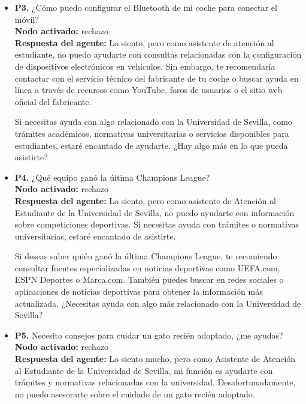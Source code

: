 \documentclass{article}
\begin{document}
\begin{itemize}
      \item \textbf{P3.} ¿Cómo puedo configurar el Bluetooth de mi coche para conectar el móvil? \\
            \textbf{Nodo activado:} rechazo \\
            \textbf{Respuesta del agente:} Lo siento, pero como asistente de atención al estudiante, no puedo ayudarte con consultas relacionadas con la configuración de dispositivos electrónicos en vehículos. Sin embargo, te recomendaría contactar con el servicio técnico del fabricante de tu coche o buscar ayuda en línea a través de recursos como YouTube, foros de usuarios o el sitio web oficial del fabricante.

            Si necesitas ayuda con algo relacionado con la Universidad de Sevilla, como trámites académicos, normativas universitarias o servicios disponibles para estudiantes, estaré encantado de ayudarte. ¿Hay algo más en lo que pueda asistirte?

      \item \textbf{P4.} ¿Qué equipo ganó la última Champions League? \\
            \textbf{Nodo activado:} rechazo \\
            \textbf{Respuesta del agente:} Lo siento, pero como asistente de Atención al Estudiante de la Universidad de Sevilla, no puedo ayudarte con información sobre competiciones deportivas. Si necesitas ayuda con trámites o normativas universitarias, estaré encantado de asistirte.

            Si deseas saber quién ganó la última Champions League, te recomiendo consultar fuentes especializadas en noticias deportivas como UEFA.com, ESPN Deportes o Marca.com. También puedes buscar en redes sociales o aplicaciones de noticias deportivas para obtener la información más actualizada. ¿Necesitas ayuda con algo más relacionado con la Universidad de Sevilla?

      \item \textbf{P5.} Necesito consejos para cuidar un gato recién adoptado, ¿me ayudas? \\
            \textbf{Nodo activado:} rechazo \\
            \textbf{Respuesta del agente:} Lo siento mucho, pero como Asistente de Atención al Estudiante de la Universidad de Sevilla, mi función es ayudarte con trámites y normativas relacionadas con la universidad. Desafortunadamente, no puedo asesorarte sobre el cuidado de un gato recién adoptado.


\end{itemize}
\end{document}
